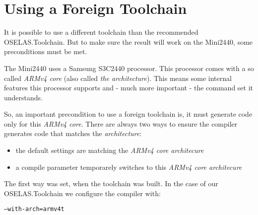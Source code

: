 %
%
%
%
%
%

\section{Using a Foreign Toolchain}		\label{sec:foreigntoolchain}

It is possible to use a different toolchain than the recommended OSELAS.Toolchain.
But to make sure the result will work on the Mini2440, some preconditions must
be met.

The Mini2440 uses a Samsung S3C2440 processor. This processor comes with a so
called \textit{ARMv4 core} (also called \textit{the architecture}). This means
some internal features this processor supports and - much more important - the
command set it understands.

So, an important precondition to use a foreign toolchain is, it must generate
code only for this \textit{ARMv4 core}. There are always two ways to ensure the
compiler generates code that matches the \textit{architecture}:

\begin{itemize}
	\item the default settings are matching the \textit{ARMv4 core architecure}
	\item a compile parameter temporarely switches to this \textit{ARMv4 core architecure}
\end{itemize}

The first way was set, when the toolchain was built. In the case of our
OSELAS.Toolchain we configure the compiler with:

\texttt{--with-arch=armv4t}

